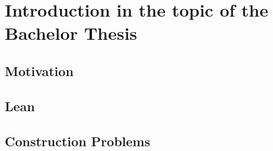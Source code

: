 \chapter[Introduction]{Introduction in the topic of the Bachelor Thesis}

\section{Motivation}

\section{Lean}

\section{Construction Problems}